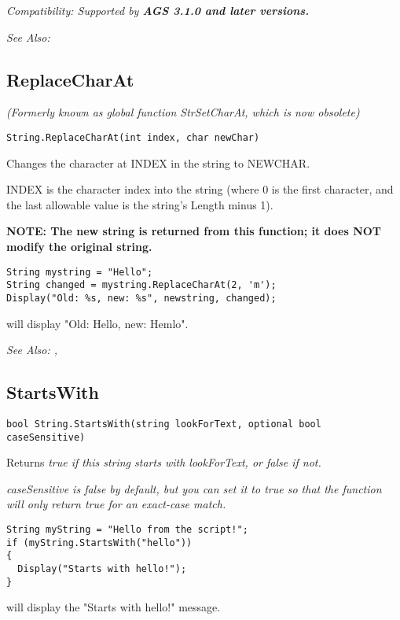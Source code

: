 \it{Compatibility:} Supported by \bf{AGS 3.1.0} and later versions.

\it{See Also:} 


\subsection{ReplaceCharAt}\label{String.ReplaceCharAt}%

\it{(Formerly known as global function StrSetCharAt, which is now obsolete)}

\begin{verbatim}
String.ReplaceCharAt(int index, char newChar)
\end{verbatim}
Changes the character at INDEX in the string to NEWCHAR.

INDEX is the character index into the string (where 0 is the first character,
and the last allowable value is the string's Length minus 1).

\bf{NOTE:} The new string is returned from this function; it
does \bf{NOT} modify the original string.

\begin{verbatim}
String mystring = "Hello";
String changed = mystring.ReplaceCharAt(2, 'm');
Display("Old: %s, new: %s", newstring, changed);
\end{verbatim}
will display "Old: Hello, new: Hemlo".

\it{See Also:} ,


\subsection{StartsWith}\label{String.StartsWith}%

\begin{verbatim}
bool String.StartsWith(string lookForText, optional bool caseSensitive)
\end{verbatim}
Returns \it{true} if this string starts with \it{lookForText}, or \it{false} if not.

\it{caseSensitive} is \it{false} by default, but you can set it to true so that the
function will only return \it{true} for an exact-case match.

\begin{verbatim}
String myString = "Hello from the script!";
if (myString.StartsWith("hello"))
{
  Display("Starts with hello!");
}
\end{verbatim}
will display the "Starts with hello!" message.

